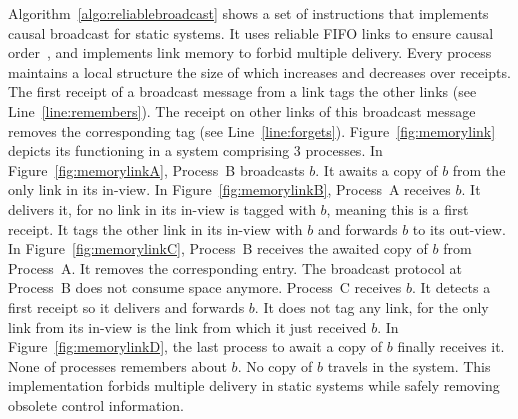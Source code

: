 Algorithm~\ref{algo:reliablebroadcast} shows a set of instructions that
implements causal broadcast for static systems. It uses reliable FIFO links to
ensure causal order~\cite{friedman2004causal}, and implements link memory
to forbid multiple delivery. Every process maintains a local structure the size
of which increases and decreases over receipts.  The first receipt of a
broadcast message from a link tags the other links (see
Line~\ref{line:remembers}). The receipt on other links of this broadcast message
removes the corresponding tag (see
Line~\ref{line:forgets}). Figure~\ref{fig:memorylink} depicts its functioning in
a system comprising 3 processes. In Figure~\ref{fig:memorylinkA}, Process~B
broadcasts $b$. It awaits a copy of $b$ from the only link in its in-view. In
Figure~\ref{fig:memorylinkB}, Process~A receives $b$. It delivers it, for no
link in its in-view is tagged with $b$, meaning this is a first receipt. It tags
the other link in its in-view with $b$ and forwards $b$ to its out-view. In
Figure~\ref{fig:memorylinkC}, Process~B receives the awaited copy of $b$ from
Process~A. It removes the corresponding entry. The broadcast protocol at
Process~B does not consume space anymore. Process~C receives $b$. It detects a
first receipt so it delivers and forwards $b$. It does not tag any link, for the
only link from its in-view is the link from which it just received $b$. In
Figure~\ref{fig:memorylinkD}, the last process to await a copy of $b$ finally
receives it. None of processes remembers about $b$. No copy of $b$ travels in
the system. This implementation forbids multiple delivery in static systems
while safely removing obsolete control information.


